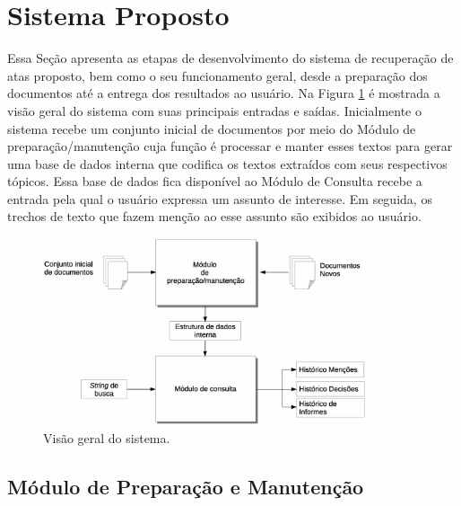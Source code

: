 \section{Sistema Proposto}
\label{sec:sistema-proposto}

Essa Seção apresenta as etapas de desenvolvimento do sistema de recuperação de atas proposto, bem como o seu funcionamento geral, desde a preparação dos documentos até a entrega dos resultados ao usuário. 
Na Figura \ref{fig:visao-geral} é mostrada a visão geral do sistema com suas principais entradas e saídas. Inicialmente o sistema recebe um conjunto inicial de documentos por meio do Módulo de preparação/manutenção cuja função é processar e manter esses textos para gerar uma base de dados interna que codifica os textos extraídos com seus respectivos tópicos. Essa base de dados fica disponível ao Módulo de Consulta recebe a entrada pela qual o usuário expressa um assunto de interesse. Em seguida, os trechos de texto que fazem menção ao esse assunto são exibidos ao usuário.


  \begin{figure}[!h]
	  \centering
	  \includegraphics[width=0.85\textwidth]{conteudo/capitulos/figs/visao-geral-3.eps}
	  \caption{Visão geral do sistema.}
	  \label{fig:visao-geral}
  \end{figure}









\subsection{Módulo de Preparação e Manutenção}\label{sec:modulo-preparacao}

